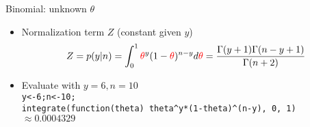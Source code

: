 \documentclass[english,t]{beamer}
\begin{document}
\begin{frame}{Binomial: unknown $\theta$}

  \begin{itemize}
  \item Normalization term $Z$ (constant given $y$)
    \begin{equation*}
      Z=p(y|n)= \int_0^1 {\color{red}\theta}^y(1-{\color{red}\theta})^{n-y} d{\color{red}\theta} = \frac{\Gamma(y+1)\Gamma(n-y+1)}{\Gamma(n+2)}
    \end{equation*}
  \item<2-> Evaluate with $y=6, n=10$\\
    {\scriptsize\texttt{y<-6;n<-10;\\integrate(function(theta) theta\^{}y*(1-theta)\^{}(n-y), 0, 1)} $\approx 0.0004329$}\\
    \\
  \end{itemize}

\end{frame}


\end{document}
